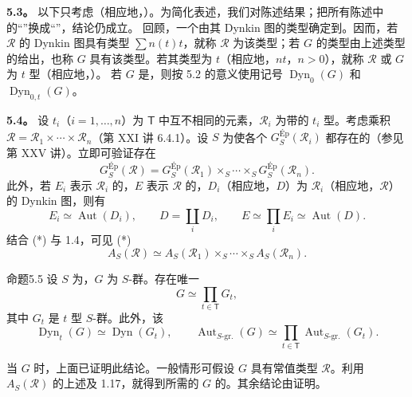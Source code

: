 \textbf{5.3。} 以下只考虑（相应地，）。为简化表述，我们对陈述结果；把所有陈述中的“”换成“”，结论仍成立。
回顾，一个由其 Dynkin 图的类型确定到。因而，若 $\mathscr R$ 的 Dynkin 图具有类型 $\sum n(t)t$，就称 $\mathscr R$ 为该类型；若 $G$ 的类型由上述类型的给出，也称 $G$ 具有该类型。若其类型为 $t$（相应地，$nt$，$n>0$），就称 $\mathscr R$ 或 $G$ 为 $t$ 型（相应地，）。
若 $G$ 是，则按 5.2 的意义使用记号 $\operatorname{Dyn}_0(G)$ 和 $\operatorname{Dyn}_{0,t}(G)$。

\textbf{5.4。} 设 $t_i$（$i=1,\ldots,n$）为 $\mathsf T$ 中互不相同的元素，$\mathscr R_i$ 为带的 $t_i$ 型。考虑乘积 $\mathscr R=\mathscr R_1\times\cdots\times\mathscr R_n$（第 XXI 讲 6.4.1）。设 $S$ 为使各个 $G_S^{\mathrm{Ép}}(\mathscr R_i)$ 都存在的（参见第 XXV 讲）。立即可验证存在
\[G_S^{\mathrm{Ép}}(\mathscr R)=G_S^{\mathrm{Ép}}(\mathscr R_1)\mathop{\times}_S\cdots\mathop{\times}_S G_S^{\mathrm{Ép}}(\mathscr R_n).\tag{*}\]
此外，若 $E_i$ 表示 $\mathscr R_i$ 的，$E$ 表示 $\mathscr R$ 的，$D_i$（相应地，$D$）为 $\mathscr R_i$（相应地，$\mathscr R$）的 Dynkin 图，则有
\[E_i\simeq\operatorname{Aut}(D_i),\qquad D=\coprod_iD_i,\qquad E\simeq\prod_iE_i\simeq\operatorname{Aut}(D).\]
结合 (*) 与 1.4，可见 (*) 
\[A_S(\mathscr R)\simeq A_S(\mathscr R_1)\mathop{\times}_S\cdots\mathop{\times}_S A_S(\mathscr R_n).\]

\begin{SGAresult}{命题}{5.5}
设 $S$ 为，$G$ 为 $S$-群。存在唯一
\[G\simeq\prod_{t\in\mathsf T}G_t,\]
其中 $G_t$ 是 $t$ 型 $S$-群。此外，该
\[\operatorname{Dyn}_t(G)\simeq\operatorname{Dyn}(G_t),\qquad \operatorname{Aut}_{S\text{-gr.}}(G)\simeq\prod_{t\in\mathsf T}\operatorname{Aut}_{S\text{-gr.}}(G_t).\]
\end{SGAresult}
当 $G$ 时，上面已证明此结论。一般情形可假设 $G$ 具有常值类型 $\mathscr R$。利用 $A_S(\mathscr R)$ 的上述及 1.17，就得到所需的 $G$ 的。其余结论由证明。

